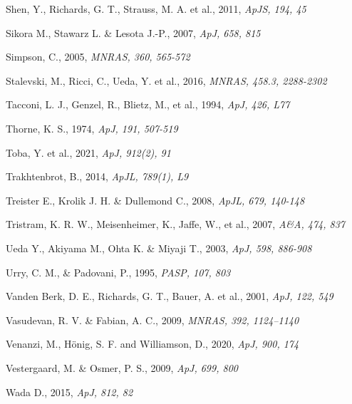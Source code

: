 \documentclass[]{aa}
\begin{document}
\begin{thebibliography}{}
Shen, Y., Richards, G. T., Strauss, M. A. et al., 2011,
\newblock \emph{ApJS, 194, 45}

Sikora M., Stawarz L. \& Lesota J.-P., 2007,
\newblock \emph{ApJ, 658, 815}

Simpson, C., 2005,
\newblock \emph{MNRAS, 360, 565-572}

Stalevski, M., Ricci, C., Ueda, Y. et al., 2016,
\newblock \emph{MNRAS, 458.3, 2288-2302}

Tacconi, L. J., Genzel, R., Blietz, M., et al., 1994,
\newblock \emph{ApJ, 426, L77}

Thorne, K. S., 1974,
\newblock \emph{ApJ, 191, 507-519}

Toba, Y. et al., 2021,
\newblock \emph{ApJ, 912(2), 91}

Trakhtenbrot, B., 2014,
\newblock \emph{ApJL, 789(1), L9}

Treister E., Krolik J. H. \& Dullemond C., 2008,
\newblock \emph{ApJL, 679, 140-148}

Tristram, K. R. W., Meisenheimer, K., Jaffe, W., et al., 2007,
\newblock \emph{A\&A, 474, 837}

Ueda Y., Akiyama M., Ohta K. \& Miyaji T., 2003,
\newblock \emph{ApJ, 598, 886-908}

Urry, C. M., \& Padovani, P., 1995,
\newblock \emph{PASP, 107, 803}

Vanden Berk, D. E.,  Richards, G. T., Bauer, A. et al., 2001,
\newblock \emph{ApJ, 122, 549}

Vasudevan, R. V. \& Fabian, A. C., 2009,
\newblock \emph{MNRAS, 392, 1124–1140}

Venanzi, M., H\"{o}nig, S. F. and Williamson, D., 2020,
\newblock \emph{ApJ, 900, 174}

Vestergaard, M. \& Osmer, P. S., 2009,
\newblock \emph{ApJ, 699, 800}

Wada D., 2015,
\newblock \emph{ApJ, 812, 82}


\end{thebibliography}
\end{document}
